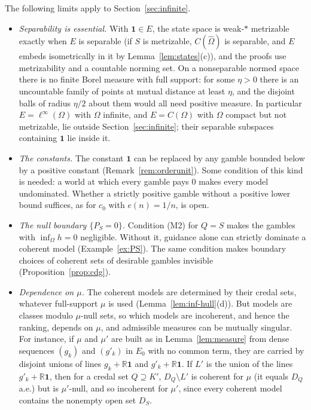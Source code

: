 \documentclass[11pt]{article}
\newcommand{\R}{\mathbb{R}}
\newcommand{\one}{\mathbf{1}}
\theoremstyle{plain}
\theoremstyle{definition}
\theoremstyle{remark}
\begin{document}
The following limits apply to Section~\ref{sec:infinite}.
\begin{itemize}
  \item \emph{Separability is essential.} With $\one\in E$, the state space is
  weak-$\ast$ metrizable exactly when $E$ is separable (if $S$ is metrizable, $C(\hat
  \Omega)$ is separable, and $E$ embeds isometrically in it by Lemma~\ref{lem:states}(c)),
  and the proofs use metrizability and a countable norming set. On a nonseparable normed space there is no finite Borel measure
  with full support: for some $\eta>0$ there is an uncountable family of points at mutual
  distance at least $\eta$, and the disjoint balls of radius $\eta/2$ about them would all
  need positive measure. In particular $E=\ell^\infty(\Omega)$ with $\Omega$ infinite, and
  $E=C(\Omega)$ with $\Omega$ compact but not metrizable, lie outside
  Section~\ref{sec:infinite}; their separable subspaces containing $\one$ lie inside it.
  \item \emph{The constants.} The constant $\one$ can be replaced by any gamble bounded
  below by a positive constant (Remark~\ref{rem:orderunit}). Some condition of this kind is
  needed: a world at which every gamble pays $0$ makes every model undominated. Whether a
  strictly positive gamble without a positive lower bound suffices, as for $c_0$ with
  $e(n)=1/n$, is open.
  \item \emph{The null boundary $\{P_S=0\}$.} Condition (M2) for $Q=S$ makes the gambles
  with $\inf_\Omega h=0$ negligible. Without it, guidance alone can strictly dominate a
  coherent model (Example~\ref{ex:PS}). The same condition makes boundary choices of
  coherent sets of desirable gambles invisible (Proposition~\ref{prop:cdg}).
  \item \emph{Dependence on $\mu$.} The coherent models are determined by their credal
  sets, whatever full-support $\mu$ is used (Lemma~\ref{lem:inf-hull}(d)). But models are
  classes modulo $\mu$-null sets, so which models are incoherent, and hence the ranking,
  depends on $\mu$, and admissible measures can be mutually singular. For instance, if
  $\mu$ and $\mu'$ are built as in Lemma~\ref{lem:measure} from dense sequences $(g_k)$ and
  $(g'_k)$ in $E_0$ with no common term, they are carried by disjoint unions of lines
  $g_k+\R\one$ and $g'_k+\R\one$. If $L'$ is the union of the lines $g'_k+\R\one$, then
  for a credal set $Q\supseteq K'$, $D_Q\setminus L'$ is coherent for $\mu$ (it equals $D_Q$ a.e.) but is $\mu'$-null, and so
  incoherent for $\mu'$, since every coherent model contains the nonempty open set $D_S$.

\end{itemize}
\end{document}
